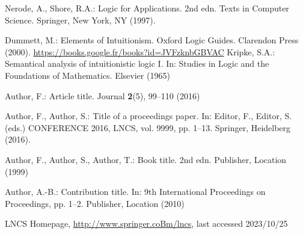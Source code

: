 \documentclass[runningheads]{llncs}
\begin{document}
%
%
%
% 
% 
%
\begin{thebibliography}{8}

    Nerode, A., Shore, R.A.: Logic for Applications. 2nd edn. Texts in Computer Science. Springer, New York, NY (1997). 
    
    Dummett, M.: Elements of Intuitionism. Oxford Logic Guides. Clarendon Press (2000). \url{https://books.google.fr/books?id=JVFzknbGBVAC}
    Kripke, S.A.: Semantical analysis of intuitionistic logic I. In: Studies in Logic and the Foundations of Mathematics. Elsevier (1965)


Author, F.: Article title. Journal \textbf{2}(5), 99--110 (2016)

Author, F., Author, S.: Title of a proceedings paper. In: Editor,
F., Editor, S. (eds.) CONFERENCE 2016, LNCS, vol. 9999, pp. 1--13.
Springer, Heidelberg (2016). 

Author, F., Author, S., Author, T.: Book title. 2nd edn. Publisher,
Location (1999)

Author, A.-B.: Contribution title. In: 9th International Proceedings
on Proceedings, pp. 1--2. Publisher, Location (2010)


LNCS Homepage, \url{http://www.springer.coBm/lncs}, last accessed 2023/10/25
\end{thebibliography}
\end{document}

